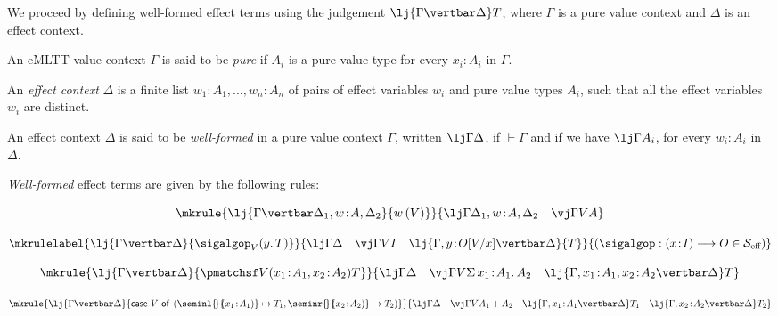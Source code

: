 We proceed by defining well-formed effect terms using the judgement $\lj {\Gamma \vertbar \Delta} T$, where $\Gamma$ is a pure value context and $\Delta$ is an effect context.

\begin{definition}
An eMLTT value context $\Gamma$ is said to be \emph{pure} if $A_i$ is a pure value type for every $x_i \!:\! A_i$ in $\Gamma$.
\end{definition}

\begin{definition}
An \emph{effect context} $\Delta$ is a finite list $w_1 \!:\! A_1, \ldots, w_n \!:\! A_n$ of pairs of effect variables $w_{i}$ and pure value types $A_{i}$, such that all the effect variables $w_{i}$ are distinct. 
\end{definition}

\begin{definition}
\label{def:wellformedeffectcontext}
An effect context $\Delta$ is said to be \emph{well-formed} in a pure value context $\Gamma$, written $\lj \Gamma \Delta$, if $\vdash \Gamma$ and if we have $\lj \Gamma {A_i}$, for every $w_{i} \!:\! A_{i}$ in $\Delta$.
\end{definition}

\begin{definition}
\label{def:wellformedeffectterms}
\emph{Well-formed} effect terms are given by the following rules:


\vspace{0.15cm}

\[
\mkrule
{\lj {\Gamma \vertbar \Delta_1, w \!:\! A, \Delta_2} {w\,(V)}}
{\lj \Gamma {\Delta_1, w \!:\! A, \Delta_2} \quad \vj \Gamma V A}
\]

\vspace{0.05cm}

\[
\mkrulelabel
{\lj {\Gamma \vertbar \Delta} {\sigalgop_V(y .\, T)}}
{
\lj \Gamma \Delta 
\quad 
\vj \Gamma V I 
\quad 
\lj {\Gamma, y \!:\! O[V/x] \vertbar \Delta} {T}
}
{(\sigalgop : (x \!:\! I) \longrightarrow O \in \mathcal{S}_{\text{eff}})}
\]


\vspace{0.05cm}

\[
\mkrule
{\lj {\Gamma \vertbar \Delta} {\pmatchsf V {(x_1 \!:\! A_1, x_2 \!:\! A_2)} {} T}}
{
\lj \Gamma \Delta 
\quad
\vj \Gamma V \Sigma\, x_1 \!:\! A_1 .\, A_2
\quad
\lj {\Gamma, x_1 \!:\! A_1, x_2 \!:\! A_2 \vertbar \Delta} T
}
\]


\vspace{0.05cm}

\[
\mkrule
{\lj {\Gamma \vertbar \Delta} {\mathsf{case~} V \mathsf{~of}_{} \mathsf{~} ({\seminl {\!} {\!\!(x_1 \!:\! A_1)} \mapsto T_1}, {\seminr {\!} {\!\!(x_2 \!:\! A_2)} \mapsto T_2})}}
{
\lj \Gamma \Delta 
\quad
\vj \Gamma V A_1 + A_2
\quad
\lj {\Gamma, x_1 \!:\! A_1 \vertbar \Delta} T_1
\quad
\lj {\Gamma, x_2 \!:\! A_2 \vertbar \Delta} T_2
}
\]
\end{definition}

